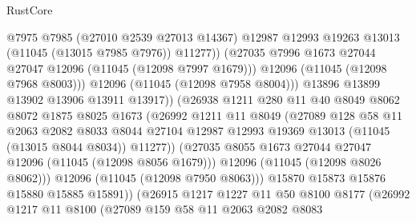 \begin{lexlean}{RustCore}
\begin{coremodule}
                                @7975
                                @7985
                                (@27010 @2539 @27013 @14367)
                                @12987
                                @12993
                                @19263
                                @13013
                                (@11045 (@13015 @7985 @7976))
                                @11277))
                            (@27035 @7996 @1673 @27044 @27047 @12096 (@11045 (@12098 @7997 @1679)))
                            @12096
                            (@11045 (@12098 @7968 @8003)))
                          @12096
                          (@11045 (@12098 @7958 @8004)))
                        @13896
                        @13899
                        @13902
                        @13906
                        @13911
                        @13917))
                    (@26938
                      @1211
                      @280
                      @11
                      @40
                      @8049
                      @8062
                      @8072
                      @1875
                      @8025
                      @1673
                      (@26992
                        @1211
                        @11
                        @8049
                        (@27089
                          @128
                          @58
                          @11
                          @2063
                          @2082
                          @8033
                          @8044
                          @27104
                          @12987
                          @12993
                          @19369
                          @13013
                          (@11045 (@13015 @8044 @8034))
                          @11277))
                      (@27035 @8055 @1673 @27044 @27047 @12096 (@11045 (@12098 @8056 @1679)))
                      @12096
                      (@11045 (@12098 @8026 @8062)))
                    @12096
                    (@11045 (@12098 @7950 @8063)))
                  @15870
                  @15873
                  @15876
                  @15880
                  @15885
                  @15891))
              (@26915
                @1217
                @1227
                @11
                @50
                @8100
                @8177
                (@26992
                  @1217
                  @11
                  @8100
                  (@27089
                    @159
                    @58
                    @11
                    @2063
                    @2082
                    @8083

\end{coremodule}
\end{lexlean}
